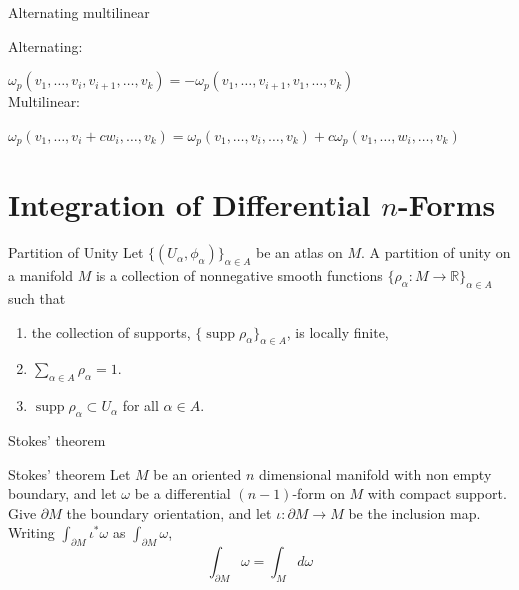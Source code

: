 \documentclass[9pt]{beamer}
\DeclareMathOperator{\supp}{supp}
\begin{document}
\begin{frame}{Alternating multilinear}
    \begin{center}
        Alternating:

        $\omega_p(v_1, \dots, v_i, v_{i+1}, \dots, v_k)=-\omega_p(v_1, \dots, v_{i+1}, v_1, \dots, v_k)$\\[15pt]

        Multilinear:

        $\omega_p(v_1, \dots,v_i+cw_i, \dots, v_k)=\omega_p(v_1, \dots,v_i, \dots, v_k)+c\omega_p(v_1, \dots,w_i, \dots, v_k)$
    \end{center}
\end{frame}

\section{Integration of Differential \texorpdfstring{$n$}{n}-Forms}

\begin{frame}
    \begin{block}{Partition of Unity}
        Let $\{(U_\alpha, \phi_\alpha)\}_{\alpha\in A}$ be an atlas on $M$. A partition of unity on a manifold $M$ is a collection of nonnegative smooth functions $\{\rho_\alpha:M \rightarrow \mathbb{R}\}_{\alpha\in A}$ such that \begin{enumerate}[i]
            \item the collection of supports, $\{\supp\rho_\alpha\}_{\alpha\in A}$, is locally finite,
            \item $\sum_{\alpha\in A} \rho_\alpha = 1.$
            \item $\supp \rho_\alpha\subset U_\alpha$ for all $\alpha\in A$.
        \end{enumerate}
    \end{block}
\end{frame}

\begin{frame}{Stokes' theorem}
    \begin{block}{Stokes' theorem}
    Let $M$ be an oriented $n$ dimensional manifold with non empty boundary, and let $\omega$ be a differential $(n-1)$-form on $M$ with compact support. Give $\partial M$ the boundary orientation, and let $\iota:\partial M \rightarrow M$ be the inclusion map. Writing $\int_{\partial M}\iota^*\omega$ as $\int_{\partial M}\omega$, \[\int_{\partial M}\omega = \int_Md\omega\]
    \end{block}
\end{frame}
\end{document}
